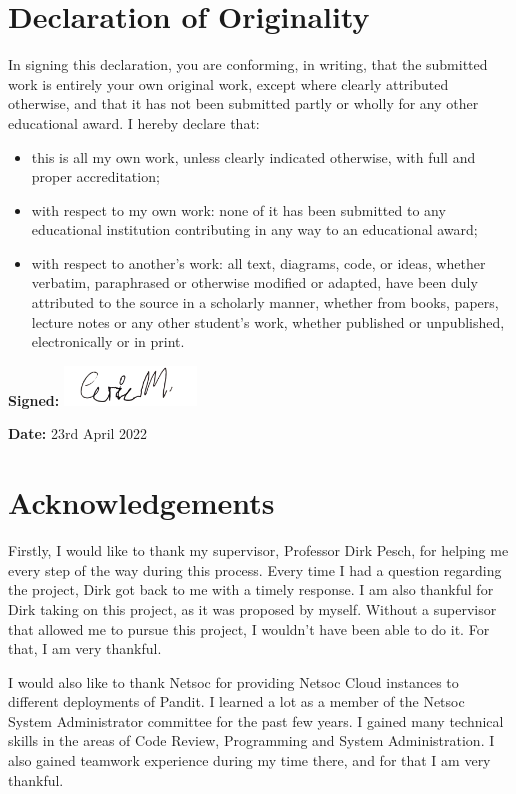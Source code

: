 \documentclass[a4paper,12pt]{report}
\begin{document}
\chapter*{Declaration of Originality}
In signing this declaration, you are conforming, in writing, that the submitted work is entirely your own original work, except where clearly attributed otherwise, and that it has not been submitted partly or wholly for any other educational award.
I hereby declare that:
\begin{itemize}
    \item this is all my own work, unless clearly indicated otherwise, with full and proper accreditation;
    \item with respect to my own work: none of it has been submitted to any educational institution contributing in any way to an educational award;
    \item with respect to another’s work: all text, diagrams, code, or ideas,
whether verbatim, paraphrased or otherwise modified or adapted, have
been duly attributed to the source in a scholarly manner, whether
from books, papers, lecture notes or any other student’s work, whether
published or unpublished, electronically or in print.
\end{itemize}

\textbf{Signed:} \includegraphics[width=100pt]{sig.png}

\textbf{Date: } 23rd April 2022

\chapter*{Acknowledgements}

Firstly, I would like to thank my supervisor, Professor Dirk Pesch, for helping me every step of the way during this process. 
Every time I had a question regarding the project, Dirk got back to me with a timely response. 
I am also thankful for Dirk taking on this project, as it was proposed by myself. 
Without a supervisor that allowed me to pursue this project, I wouldn't have been able to do it.
For that, I am very thankful.

I would also like to thank Netsoc for providing Netsoc Cloud instances to different deployments of Pandit.
I learned a lot as a member of the Netsoc System Administrator committee for the past few years.
I gained many technical skills in the areas of Code Review, Programming and System Administration.
I also gained teamwork experience during my time there, and for that I am very thankful.
\end{document}
